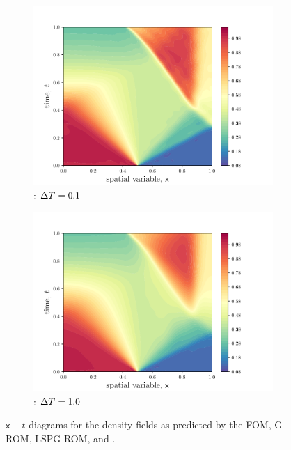 \begin{figure}
\begin{center}
\begin{subfigure}[t]{0.48\textwidth}
\includegraphics[width=1.\linewidth]{figs/sod/xt_w50.pdf}
\caption{\methodAcronym: $\Delta T^{} = 0.1$}
\end{subfigure}
\begin{subfigure}[t]{0.48\textwidth}
\includegraphics[width=1.\linewidth]{figs/sod/xt_w500.pdf}
\caption{\methodAcronym: $\Delta T^{} = 1.0$}
\end{subfigure}
\caption{$\mathsf{x}-t$ diagrams for the density fields as predicted by the FOM, G-ROM,
	LSPG-ROM, and \methodAcronymROMs. }
\label{fig:sod_xt}
\end{center}
\end{figure}

